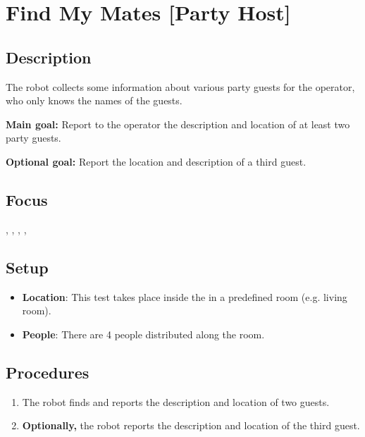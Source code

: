 \section{Find My Mates [Party Host]}
\label{test:find-my-mates}

\subsection*{Description}
    The robot collects some information about various party guests for the operator, who only knows the names of the guests.

\noindent \textbf{Main goal:}
    Report to the operator the description and location of at least two party guests.

\noindent \textbf{Optional goal:}
    Report the location and description of a third guest.

\subsection*{Focus}
\SysI{}, \HRI{}, \PerDet{}, \PerRec{}, 

\subsection*{Setup}
\begin{itemize}
	\item \textbf{Location}: This test takes place inside the \Arena{} in a predefined room (e.g. living room).
	\item \textbf{People}: There are 4 people distributed along the room.
\end{itemize}

\subsection*{Procedures}
\begin{enumerate}
	\item The robot finds and reports the description and location of two guests.
	\item \textbf{Optionally,} the robot reports the description and location of the third guest.
\end{enumerate}

